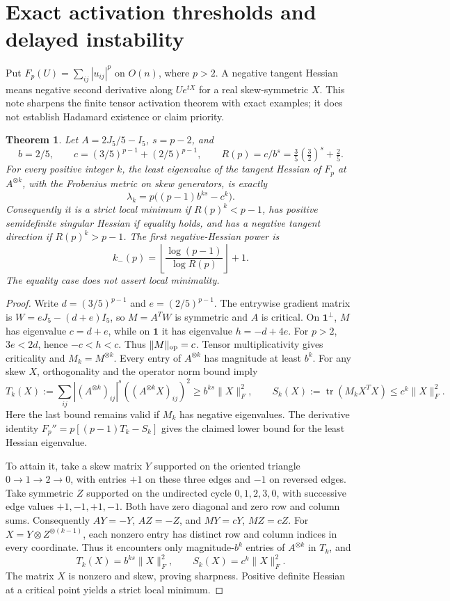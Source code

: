 \documentclass[11pt]{article}
\newtheorem{theorem}{Theorem}[section]
\newcommand{\tr}{\operatorname{tr}}
\begin{document}
\section{Exact activation thresholds and delayed instability}

Put $F_p(U)=\sum_{ij}|u_{ij}|^p$ on $O(n)$, where $p>2$.
A negative tangent Hessian means negative second derivative along
$Ue^{tX}$ for a real skew-symmetric $X$. This note sharpens the finite
tensor activation theorem with exact examples; it does not establish
Hadamard existence or claim priority.

\begin{theorem}\label{activation:main}
Let $A=2J_5/5-I_5$, $s=p-2$, and
\[
 b=2/5,\qquad c=(3/5)^{p-1}+(2/5)^{p-1},\qquad
 R(p)=c/b^s=\tfrac35(\tfrac32)^s+\tfrac25.
\]
For every positive integer $k$, the least eigenvalue of the tangent
Hessian of $F_p$ at $A^{\otimes k}$, with the Frobenius metric on
skew generators, is exactly
\[
 \lambda_k=p\big((p-1)b^{ks}-c^k\big).
\]
Consequently it is a strict local minimum if $R(p)^k<p-1$, has positive
semidefinite singular Hessian if equality holds, and has a negative
tangent direction if $R(p)^k>p-1$. The first negative-Hessian power is
\[
 k_-(p)=\left\lfloor\frac{\log(p-1)}{\log R(p)}\right\rfloor+1.
\]
The equality case does not assert local minimality.
\end{theorem}
\begin{proof}
Write $d=(3/5)^{p-1}$ and $e=(2/5)^{p-1}$. The entrywise gradient
matrix is $W=eJ_5-(d+e)I_5$, so $M=A^TW$ is symmetric and $A$ is
critical. On $\mathbf1^\perp$, $M$ has eigenvalue $c=d+e$, while on
$\mathbf1$ it has eigenvalue $h=-d+4e$. For $p>2$,
$3e<2d$, hence $-c<h<c$. Thus $\|M\|_{\rm op}=c$.
Tensor multiplicativity gives criticality and $M_k=M^{\otimes k}$.
Every entry of $A^{\otimes k}$ has magnitude at least $b^k$.
For any skew $X$, orthogonality and the operator norm bound imply
\[
 T_k(X):=\sum_{ij}|(A^{\otimes k})_{ij}|^s
                 ((A^{\otimes k}X)_{ij})^2\ge b^{ks}\|X\|_F^2,
 \qquad
 S_k(X):=\tr(M_kX^TX)\le c^k\|X\|_F^2.
\]
Here the last bound remains valid if $M_k$ has negative eigenvalues.
The derivative identity $F_p''=p[(p-1)T_k-S_k]$ gives the claimed
lower bound for the least Hessian eigenvalue.

To attain it, take a skew matrix $Y$ supported on the oriented triangle
$0\to1\to2\to0$, with entries $+1$ on these three edges and $-1$
on reversed edges. Take symmetric $Z$ supported on the undirected
cycle $0,1,2,3,0$, with successive edge values $+1,-1,+1,-1$.
Both have zero diagonal and zero row and column sums. Consequently
$AY=-Y$, $AZ=-Z$, and $MY=cY$, $MZ=cZ$.
For $X=Y\otimes Z^{\otimes(k-1)}$, each nonzero entry has distinct
row and column indices in every coordinate. Thus it encounters only
magnitude-$b^k$ entries of $A^{\otimes k}$ in $T_k$, and
\[
 T_k(X)=b^{ks}\|X\|_F^2,\qquad S_k(X)=c^k\|X\|_F^2.
\]
The matrix $X$ is nonzero and skew, proving sharpness. Positive
definite Hessian at a critical point yields a strict local minimum.
\end{proof}
\end{document}
